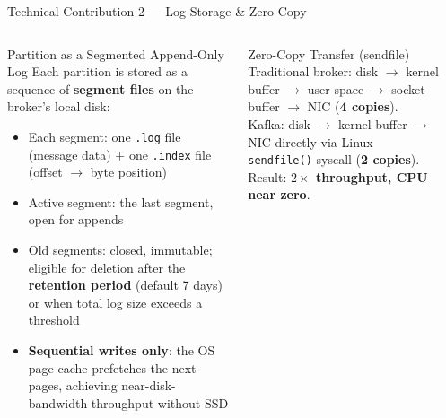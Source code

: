 \documentclass[aspectratio=169,10pt]{beamer}
\begin{document}
\begin{frame}{Technical Contribution 2 — Log Storage \& Zero-Copy}
  \begin{columns}[T]
      \begin{block}{Partition as a Segmented Append-Only Log}
        Each partition is stored as a sequence of \textbf{segment files}
        on the broker's local disk:
        \begin{itemize}
          \item Each segment: one \texttt{.log} file (message data)
                + one \texttt{.index} file (offset $\to$ byte position)
          \item Active segment: the last segment, open for appends
          \item Old segments: closed, immutable; eligible for deletion
                after the \textbf{retention period} (default 7 days)
                or when total log size exceeds a threshold
          \item \textbf{Sequential writes only}: the OS page cache
                prefetches the next pages, achieving
                near-disk-bandwidth throughput without SSD
        \end{itemize}
      \end{block}
      \vspace{4pt}
      \begin{alertblock}{Zero-Copy Transfer (sendfile)}
        Traditional broker: disk $\to$ kernel buffer $\to$
        user space $\to$ socket buffer $\to$ NIC (\textbf{4 copies}).\\
        Kafka: disk $\to$ kernel buffer $\to$ NIC directly
        via Linux \texttt{sendfile()} syscall (\textbf{2 copies}).\\
        Result: \textbf{$2\times$ throughput, CPU near zero}.
      \end{alertblock}

      \begin{center}
\end{center}
\end{columns}
\end{frame}
\end{document}
